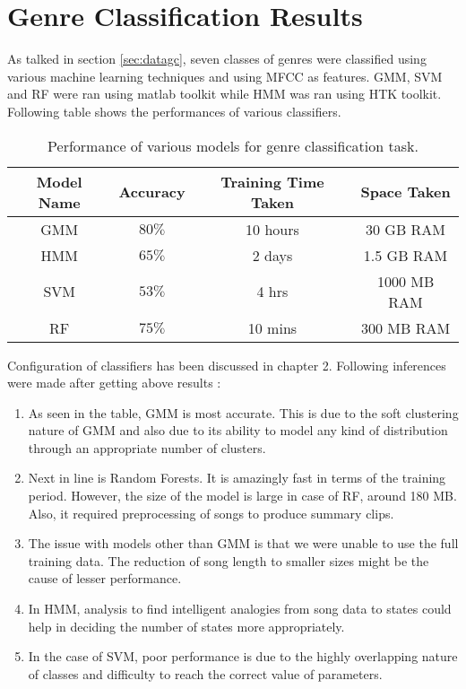 \section{Genre Classification Results}
\label{sec:gcr}
As talked in section \ref{sec:datagc}, seven classes of genres were classified using various machine learning techniques and using MFCC as features. GMM, SVM and RF were ran using matlab toolkit while HMM was ran using HTK toolkit. Following table shows the performances of various classifiers.
\begin{table}[!htbp]
\centering
\label{table:perf}

\begin{tabular}{|c|c|c|c|} 
\hline
 Model Name & Accuracy & Training Time Taken & Space Taken  \\ \hline
 GMM & $80\%$ & 10 hours & 30 GB RAM \\ \hline
 HMM & $65\%$ & 2 days & 1.5 GB RAM \\ \hline
 SVM & $53\%$ & 4 hrs  & 1000 MB RAM \\ \hline
 RF & $75\%$   &  10 mins & 300 MB RAM  \\ \hline
\end{tabular}
\caption{Performance of various models for genre classification task.}
	\end{table}
\par Configuration of classifiers has been discussed in chapter 2. Following inferences were made after getting above results :
\begin{enumerate} %
\item As seen in the table, GMM is most accurate. This is due to the soft clustering nature of GMM and also due to its ability to model any kind of distribution through an appropriate number of clusters. 
\item Next in line is Random Forests. It is amazingly fast in terms of the training period. However, the size of the model is large in case of RF, around 180 MB. Also, it required preprocessing of songs to produce summary clips.
\item The issue with models other than GMM is that we were unable to use the full training data. The reduction of song length to smaller sizes might be the cause of lesser performance. 
\item In HMM, analysis to find intelligent analogies from song data to states could help in deciding			 the number of states more appropriately.
\item In the case of SVM, poor performance is due to the highly overlapping nature of classes and difficulty to reach the correct value of parameters.
\end{enumerate}

